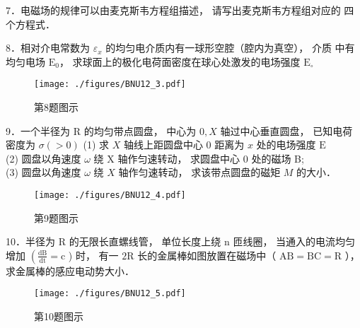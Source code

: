 7．电磁场的规律可以由麦克斯韦方程组描述， 请写出麦克斯韦方程组对应的 四个方程式．

8．相对介电常数为 $\varepsilon_{x}$ 的均匀电介质内有一球形空腔（腔内为真空）， 介质 中有均匀电场 $\mathrm{E}_{0}$， 求球面上的极化电荷面密度在球心处激发的电场强度 $\mathrm{E}_{\circ}$
\begin{figure}[ht]
\centering
\texttt{[image: ./figures/BNU12\_3.pdf]}
\caption{第8题图示} \label{BNU12_fig3}
\end{figure}

9．一个半径为 $\mathrm{R}$ 的均匀带点圆盘， 中心为 $0, X$ 轴过中心垂直圆盘， 已知电荷 密度为 $\sigma(>0)$
(1) 求 $X$ 轴线上距圆盘中心 0 距离为 $x$ 处的电场强度 $\mathrm{E} $\\
(2) 圆盘以角速度 $\omega$ 绕 $\mathrm{X}$ 轴作匀速转动， 求圆盘中心 0 处的磁场 B;\\
(3) 圆盘以角速度 $\omega$ 绕 $X$ 轴作匀速转动， 求该带点圆盘的磁矩 $M$ 的大小．
\begin{figure}[ht]
\centering
\texttt{[image: ./figures/BNU12\_4.pdf]}
\caption{第9题图示} \label{BNU12_fig4}
\end{figure}

10．半径为 $\mathrm{R}$ 的无限长直螺线管， 单位长度上绕 $\mathrm{n}$ 匝线圈， 当通入的电流均匀
增加 $\left(\frac{\mathrm{dB}}{\mathrm{dt}}=\mathrm{c}\right.$ ) 时， 有一 $2 \mathrm{R}$ 长的金属棒如图放置在磁场中（ $\mathrm{AB}=\mathrm{BC}=\mathrm{R}$ ）， 求金属棒的感应电动势大小．
\begin{figure}[ht]
\centering
\texttt{[image: ./figures/BNU12\_5.pdf]}
\caption{第10题图示} \label{BNU12_fig5}
\end{figure}